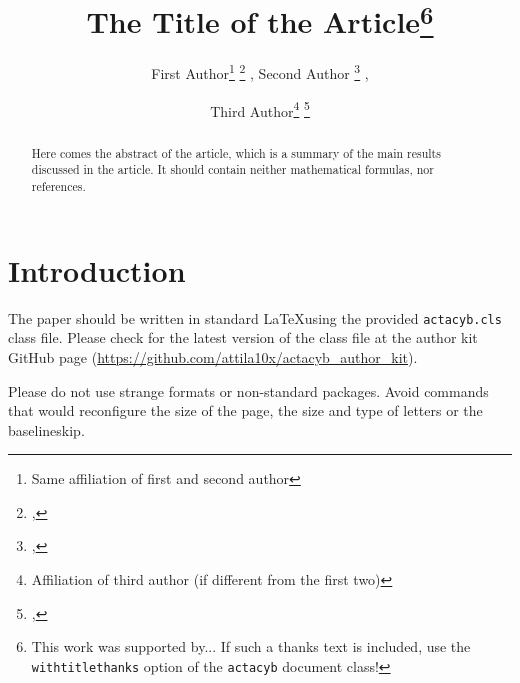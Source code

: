 \documentclass[withtitlethanks]{actacyb}
\begin{document}


\title{The Title of the Article\thanks{This work was supported by... If such a thanks text is included, use the {\tt withtitlethanks} option of the {\tt actacyb} document class!}}

\author{
First Author\thanks{Same affiliation of first and second author} \thanks{, } , Second Author \thanks{, } ,
\and Third Author\thanks{Affiliation of third author (if different from the first two)} \thanks{, }}


\maketitle


\begin{abstract}
Here comes the abstract of the article, which is a summary of the main results discussed in the article. It should contain neither mathematical formulas, nor references. 

\end{abstract}


\section{Introduction}

The paper should be written in standard \LaTeX using the provided \verb|actacyb.cls| class file. Please check for the latest version of the class file at the author kit GitHub page (\url{https://github.com/attila10x/actacyb_author_kit}).

Please do not use strange formats or non-standard packages. Avoid commands that would reconfigure the size of the page, the size and type of letters or the baselineskip. 
\end{document}
